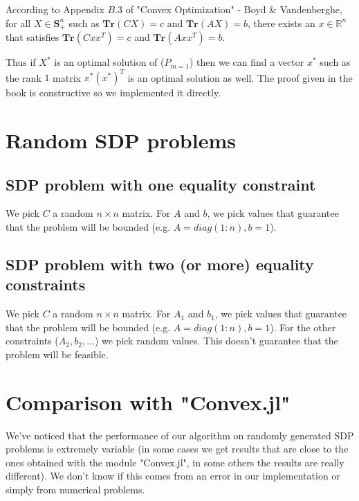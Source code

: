 \documentclass{article}
\begin{document}
According to Appendix $B.3$ of "Convex Optimization" - Boyd \& Vandenberghe, for all $X \in \mathbf{S}^n_+$ such as $\mathbf{Tr}(C X) = c$ and $\mathbf{Tr}(A X) = b$, there exists an $x \in \mathbb{R}^n$ that satisfies $\mathbf{Tr}(C x x^T) = c$ and $\mathbf{Tr}(A x x^T) = b$. 

Thus if $X^*$ is an optimal solution of ($P_{m = 1}$) then we can find a vector $x^*$ such as the rank $1$ matrix $x^* (x^*)^T$ is an optimal solution as well. The proof given in the book is constructive so we implemented it directly.

\section{Random SDP problems}

\subsection{SDP problem with one equality constraint}
We pick $C$ a random $n \times n$ matrix. For $A$ and $b$, we pick values that guarantee that the problem will be bounded (e.g. $A = diag(1 : n), b = 1$).

\subsection{SDP problem with two (or more) equality constraints}
We pick $C$ a random $n \times n$ matrix. For $A_1$ and $b_1$, we pick values that guarantee that the problem will be bounded (e.g. $A = diag(1 : n), b = 1$). For the other constraints ($A_2, b_2, \dots$) we pick random values. This doesn't guarantee that the problem will be feasible.

\section{Comparison with "Convex.jl"}

We've noticed that the performance of our algorithm on randomly generated SDP problems is extremely variable (in some cases we get results that are close to the ones obtained with the module "Convex.jl", in some others the results are really different). We don't know if this comes from an error in our implementation or simply from numerical problems. 
\end{document}
